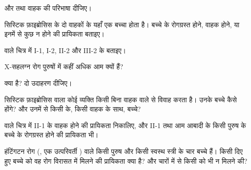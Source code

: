 \begin{exercise}[$\star$]\label{exo:g11:genes-and-disease:1}
 और   तथा वाहक की परिभाषा दीजिए।
\end{exercise}

\begin{exercise}[$\star$]\label{exo:g11:genes-and-disease:2}
सिस्टिक फ़ाइब्रोसिस के दो वाहकों के यहाँ एक बच्चा होता है। बच्चे के
रोगग्रस्त होने, वाहक होने, या इनमें से कुछ न होने की प्रायिकता बताइए।
\end{exercise}

\begin{exercise}[$\star$]\label{exo:g11:genes-and-disease:3}
 वाले चित्र में I-1, I-2, II-2 और III-2 के  बताइए।
\end{exercise}

\begin{exercise}[$\star$]\label{exo:g11:genes-and-disease:4}
X-सहलग्न  रोग पुरुषों में कहीं अधिक आम क्यों हैं?
\end{exercise}

\begin{exercise}[$\star$]\label{exo:g11:genes-and-disease:5}
 क्या है? दो उदाहरण दीजिए।
\end{exercise}

\begin{exercise}[$\star\star$]\label{exo:g11:genes-and-disease:6}
सिस्टिक फ़ाइब्रोसिस वाला कोई व्यक्ति किसी बिना वाहक वाले से विवाह करता है।
उनके बच्चे कैसे होंगे? और उनमें से किसी के, किसी वाहक के साथ, बच्चे?
\end{exercise}

\begin{exercise}[$\star\star$]\label{exo:g11:genes-and-disease:7}
 वाले चित्र में II-1 के वाहक होने की प्रायिकता निकालिए, और II-1
तथा आम आबादी के किसी पुरुष के बच्चे के रोगग्रस्त होने की प्रायिकता भी।
\end{exercise}

\begin{exercise}[$\star\star$]\label{exo:g11:genes-and-disease:8}
हंटिंगटन रोग (, एक उत्परिवर्ती ) वाले किसी पुरुष और किसी
स्वस्थ स्त्री के चार बच्चे हैं। किसी दिए हुए बच्चे को वह रोग विरासत में
मिलने की प्रायिकता क्या है? और चारों में से किसी को भी न मिलने की?
\end{exercise}

